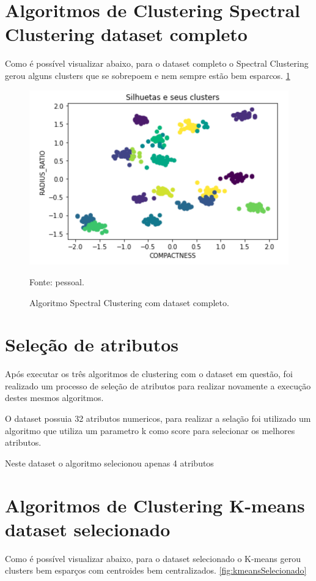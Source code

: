 \section{Algoritmos de Clustering Spectral Clustering dataset completo}

Como é possível visualizar abaixo, para o dataset completo o Spectral Clustering gerou alguns clusters que se sobrepoem e nem sempre estão bem esparcos. \ref{fig:spectralClusteringCompleto}

\begin{figure}[h]
	\centering
	\includegraphics[width=0.7\linewidth]{images/spectralClusteringCompleto}
	\caption{Algoritmo Spectral Clustering com dataset completo.}
	Fonte: pessoal.
	\label{fig:spectralClusteringCompleto}
\end{figure}

\section{Seleção de atributos}

Após executar os três algoritmos de clustering com o dataset em questão, foi realizado um processo de seleção de atributos para realizar novamente a execução destes mesmos algoritmos.

O dataset possuia 32 atributos numericos, para realizar a selação foi utilizado um algoritmo que utiliza um parametro k como score para selecionar os melhores atributos.

Neste dataset o algoritmo selecionou apenas 4 atributos

\section{Algoritmos de Clustering K-means dataset selecionado}

Como é possível visualizar abaixo, para o dataset selecionado o K-means gerou clusters bem esparços com centroides bem centralizados. \ref{fig:kmeansSelecionado}

